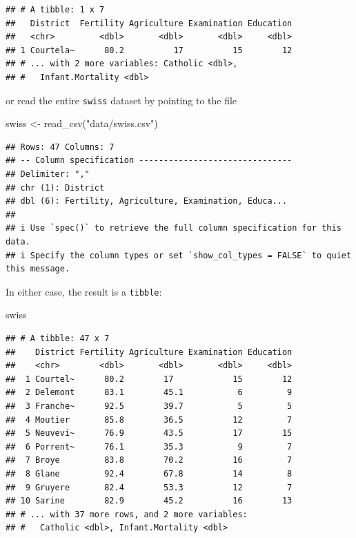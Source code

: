 \documentclass[
  12pt,
]{style/krantz}
\newenvironment{Shaded}{\begin{snugshade}}{\end{snugshade}}
\newcommand{\FunctionTok}[1]{\textcolor[rgb]{0.00,0.00,0.00}{#1}}
\newcommand{\NormalTok}[1]{#1}
\newcommand{\OtherTok}[1]{\textcolor[rgb]{0.56,0.35,0.01}{#1}}
\newcommand{\StringTok}[1]{\textcolor[rgb]{0.31,0.60,0.02}{#1}}
\begin{document}
\begin{verbatim}
## # A tibble: 1 x 7
##   District  Fertility Agriculture Examination Education
##   <chr>         <dbl>       <dbl>       <dbl>     <dbl>
## 1 Courtela~      80.2          17          15        12
## # ... with 2 more variables: Catholic <dbl>,
## #   Infant.Mortality <dbl>
\end{verbatim}

or read the entire \texttt{swiss} dataset by pointing to the file

\begin{Shaded}
\begin{Highlighting}[]
\NormalTok{swiss }\OtherTok{\textless{}{-}} \FunctionTok{read\_csv}\NormalTok{(}\StringTok{"data/swiss.csv"}\NormalTok{)}
\end{Highlighting}
\end{Shaded}

\begin{verbatim}
## Rows: 47 Columns: 7
## -- Column specification -------------------------------
## Delimiter: ","
## chr (1): District
## dbl (6): Fertility, Agriculture, Examination, Educa...
## 
## i Use `spec()` to retrieve the full column specification for this data.
## i Specify the column types or set `show_col_types = FALSE` to quiet this message.
\end{verbatim}

In either case, the result is a \texttt{tibble}:

\begin{Shaded}
\begin{Highlighting}[]
\NormalTok{swiss}
\end{Highlighting}
\end{Shaded}

\begin{verbatim}
## # A tibble: 47 x 7
##    District Fertility Agriculture Examination Education
##    <chr>        <dbl>       <dbl>       <dbl>     <dbl>
##  1 Courtel~      80.2        17            15        12
##  2 Delemont      83.1        45.1           6         9
##  3 Franche~      92.5        39.7           5         5
##  4 Moutier       85.8        36.5          12         7
##  5 Neuvevi~      76.9        43.5          17        15
##  6 Porrent~      76.1        35.3           9         7
##  7 Broye         83.8        70.2          16         7
##  8 Glane         92.4        67.8          14         8
##  9 Gruyere       82.4        53.3          12         7
## 10 Sarine        82.9        45.2          16        13
## # ... with 37 more rows, and 2 more variables:
## #   Catholic <dbl>, Infant.Mortality <dbl>
\end{verbatim}
\end{document}
